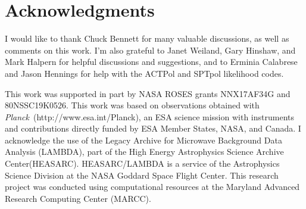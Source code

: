 \documentclass[twocolumn]{aastex63}
\newcommand{\Planck}{\textsl{Planck}}
\begin{document}
\section*{Acknowledgments}

I would like to thank Chuck Bennett for many valuable discussions, as well as comments on this work. I'm also grateful to Janet Weiland, Gary Hinshaw, and Mark Halpern for helpful discussions and suggestions, and to Erminia Calabrese and Jason Hennings for help with the ACTPol and SPTpol likelihood codes.

This work was supported in part by NASA ROSES grants NNX17AF34G and 80NSSC19K0526. This work was based on observations  obtained with \Planck\ (http://www.esa.int/Planck), an ESA science mission with instruments and contributions directly funded by ESA Member States, NASA, and Canada. I acknowledge the use of the Legacy Archive for Microwave Background Data Analysis (LAMBDA), part of the High Energy Astrophysics Science Archive Center(HEASARC). HEASARC/LAMBDA is a service of the Astrophysics Science Division at the NASA Goddard Space Flight Center. This research project was conducted using computational resources at the Maryland Advanced Research Computing Center (MARCC).


%
\end{document}
